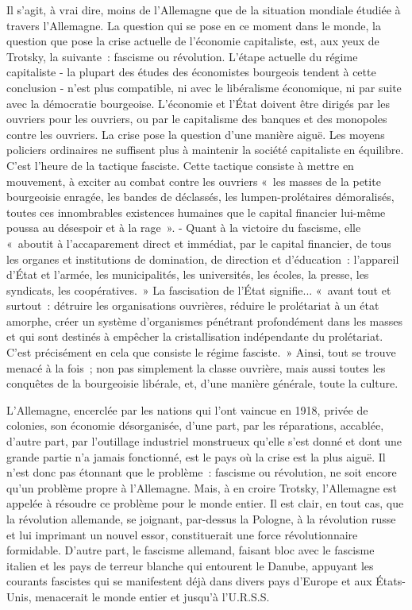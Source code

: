 \documentclass[french,twoside]{book} %
\begin{document}
Il s'agit, à vrai dire, moins de l'Allemagne que de la situation mondiale étudiée à travers l'Allemagne. La question qui se pose en ce moment dans le monde, la question que pose la crise actuelle de l'économie capitaliste, est, aux yeux de Trotsky, la suivante : fascisme ou révolution. L'étape actuelle du régi­me capitaliste - la plupart des études des économistes bourgeois tendent à cette conclusion - n'est plus compatible, ni avec le libéralisme économique, ni par suite avec la démocratie bourgeoise. L'économie et l'État doivent être dirigés par les ouvriers pour les ouvriers, ou par le capitalisme des banques et des monopoles contre les ouvriers. La crise pose la question d'une manière aiguë. Les moyens policiers ordinaires ne suffisent plus à maintenir la société capitaliste en équilibre. C'est l'heure de la tactique fasciste. Cette tactique consiste à mettre en mouvement, à exciter au combat contre les ouvriers « les masses de la petite bourgeoisie enragée, les bandes de déclassés, les lumpen-prolétaires démoralisés, toutes ces innombrables existences humaines que le capital financier lui-même poussa au désespoir et à la rage ». - Quant à la victoire du fascisme, elle « aboutit à l'accaparement direct et immédiat, par le capital financier, de tous les organes et institutions de domination, de direction et d'éducation : l'appareil d'État et l'armée, les municipalités, les universités, les écoles, la presse, les syndicats, les coopératives. » La fascisation de l'État signifie... « avant tout et surtout : détruire les organisations ouvrières, réduire le prolétariat à un état amorphe, créer un système d'organismes pénétrant profondément dans les masses et qui sont destinés à empêcher la cristallisation indépendante du prolétariat. C'est précisément en cela que consiste le régime fasciste. » Ainsi, tout se trouve menacé à la fois ; non pas simplement la classe ouvrière, mais aussi toutes les conquêtes de la bourgeoisie libérale, et, d'une manière générale, toute la culture.\par
L'Allemagne, encerclée par les nations qui l'ont vaincue en 1918, privée de colonies, son économie désorganisée, d'une part, par les réparations, accablée, d'autre part, par l'outillage industriel monstrueux qu'elle s'est donné et dont une grande partie n'a jamais fonctionné, est le pays où la crise est la plus aiguë. Il n'est donc pas étonnant que le problème : fascisme ou révolution, ne soit encore qu'un problème propre à l'Allemagne. Mais, à en croire Trotsky, l'Allemagne est appelée à résoudre ce problème pour le monde entier. Il est clair, en tout cas, que la révolution allemande, se joignant, par-dessus la Pologne, à la révolution russe et lui imprimant un nouvel essor, constituerait une force révolutionnaire formidable. D'autre part, le fascisme allemand, fai­sant bloc avec le fascisme italien et les pays de terreur blanche qui entourent le Danube, appuyant les courants fascistes qui se manifestent déjà dans divers pays d'Europe et aux États-Unis, menacerait le monde entier et jusqu'à l'U.R.S.S.\par
\end{document}
